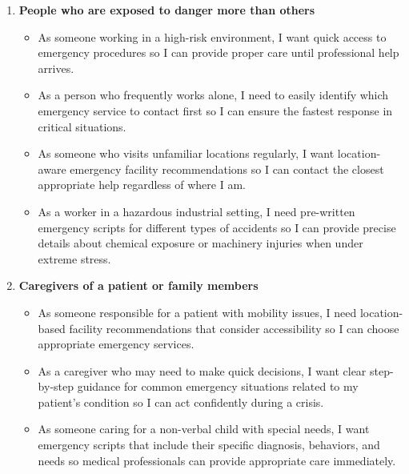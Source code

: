 \begin{enumerate}
    \item \textbf{People who are exposed to danger more than others}
    \begin{itemize}
        \item As someone working in a high-risk environment, I want quick access to emergency procedures so I can provide proper care until professional help arrives.
        \item As a person who frequently works alone, I need to easily identify which emergency service to contact first so I can ensure the fastest response in critical situations.
        \item As someone who visits unfamiliar locations regularly, I want location-aware emergency facility recommendations so I can contact the closest appropriate help regardless of where I am.
        \item As a worker in a hazardous industrial setting, I need pre-written emergency scripts for different types of accidents so I can provide precise details about chemical exposure or machinery injuries when under extreme stress.
    \end{itemize}

    \item \textbf{Caregivers of a patient or family members}
    \begin{itemize}
        \item As someone responsible for a patient with mobility issues, I need location-based facility recommendations that consider accessibility so I can choose appropriate emergency services.
        \item As a caregiver who may need to make quick decisions, I want clear step-by-step guidance for common emergency situations related to my patient's condition so I can act confidently during a crisis.
        \item As someone caring for a non-verbal child with special needs, I want emergency scripts that include their specific diagnosis, behaviors, and needs so medical professionals can provide appropriate care immediately.
    \end{itemize}
    

\end{enumerate}
